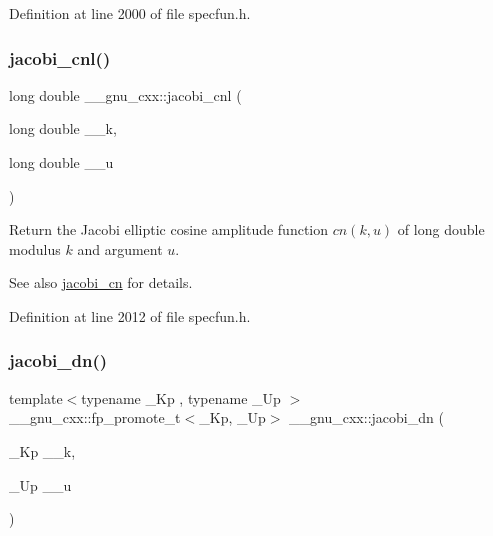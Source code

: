 Definition at line 2000 of file specfun.\+h.

\mbox{\label{group__gnu__math__spec__func_ga08892965ea520116cc53a764513fe685}} 
\subsubsection{\texorpdfstring{jacobi\+\_\+cnl()}{jacobi\_cnl()}}
{\footnotesize\ttfamily long double \+\_\+\+\_\+gnu\+\_\+cxx\+::jacobi\+\_\+cnl (\begin{DoxyParamCaption}\item[{long double}]{\+\_\+\+\_\+k,  }\item[{long double}]{\+\_\+\+\_\+u }\end{DoxyParamCaption})\hspace{0.3cm}{\ttfamily [inline]}}

Return the Jacobi elliptic cosine amplitude function $ cn(k,u) $ of {\ttfamily long double} modulus $ k $ and argument $ u $.

\begin{DoxySeeAlso}{See also}
\hyperlink{group__gnu__math__spec__func_ga2e1c43b232d378164bed1433041ca7dc}{jacobi\+\_\+cn} for details. 
\end{DoxySeeAlso}


Definition at line 2012 of file specfun.\+h.

\mbox{\label{group__gnu__math__spec__func_ga0f8fa8d6a77dbc2089d65f3f16876aa9}} 
\subsubsection{\texorpdfstring{jacobi\+\_\+dn()}{jacobi\_dn()}}
{\footnotesize\ttfamily template$<$typename \+\_\+\+Kp , typename \+\_\+\+Up $>$ \\
\+\_\+\+\_\+gnu\+\_\+cxx\+::fp\+\_\+promote\+\_\+t$<$\+\_\+\+Kp, \+\_\+\+Up$>$ \+\_\+\+\_\+gnu\+\_\+cxx\+::jacobi\+\_\+dn (\begin{DoxyParamCaption}\item[{\+\_\+\+Kp}]{\+\_\+\+\_\+k,  }\item[{\+\_\+\+Up}]{\+\_\+\+\_\+u }\end{DoxyParamCaption})\hspace{0.3cm}{\ttfamily [inline]}}

